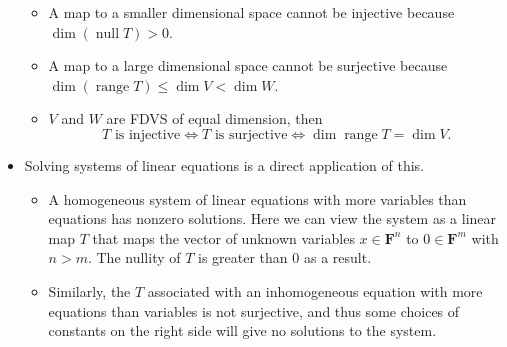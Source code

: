 \documentclass[11pt]{article}
\newcommand{\F}{\mathbf{F}}
\newcommand{\n}{\operatorname{null}}
\renewcommand{\r}{\operatorname{range}}
\renewcommand{\d}{\dim}
\begin{document}
\begin{itemize}
    \begin{itemize}
        \item A map to a smaller dimensional space cannot be injective because $\d (\n T) > 0$.
        \item A map to a large dimensional space cannot be surjective because $\d (\r T) \leq \d V < \d W$.
        \item $V$ and $W$ are FDVS of equal dimension, then $$T \text{ is injective} \Longleftrightarrow T \text{ is surjective} \Longleftrightarrow \d \r T = \d V.$$
    \end{itemize}
    \item Solving systems of linear equations is a direct application of this.
    \begin{itemize}
        \item A homogeneous system of linear equations with more variables than equations has nonzero solutions. Here we can view the system as a linear map $T$ that maps the vector of unknown variables $x \in \F^n$ to $0 \in \F^m$ with $n > m$. The nullity of $T$ is greater than 0 as a result.
        \item Similarly, the $T$ associated with an inhomogeneous equation with more equations than variables is not surjective, and thus some choices of constants on the right side will give no solutions to the system.
    \end{itemize}
\end{itemize}
\end{document}
